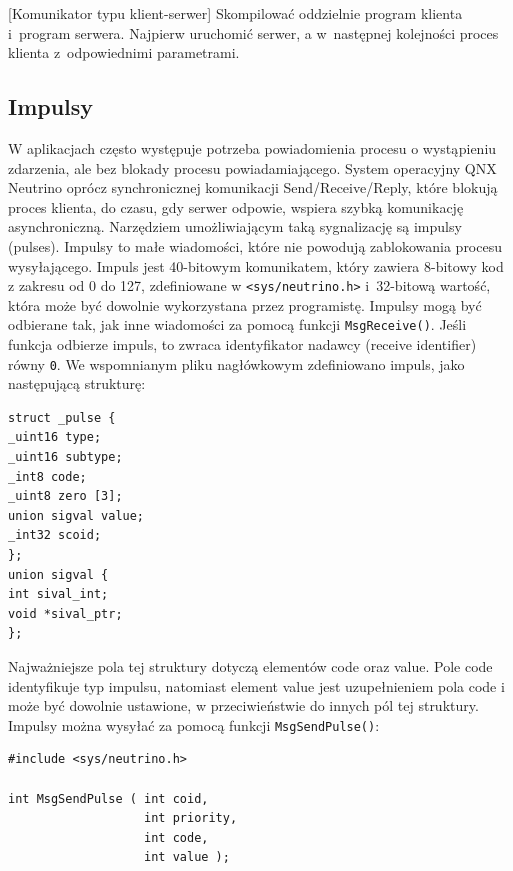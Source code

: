 \begin{example}{[Komunikator typu klient-serwer]} Skompilować oddzielnie program klienta i~program serwera. Najpierw uruchomić serwer, a w~następnej kolejności proces klienta z~odpowiednimi parametrami. 


\end{example} 




\subsection{Impulsy}

W aplikacjach często występuje potrzeba powiadomienia procesu o wystąpieniu zdarzenia, ale bez blokady procesu powiadamiającego. System operacyjny QNX Neutrino oprócz synchronicznej komunikacji Send/Receive/Reply, które blokują proces klienta, do czasu, gdy serwer odpowie, wspiera szybką komunikację asynchroniczną. Narzędziem umożliwiającym taką sygnalizację są impulsy (pulses). Impulsy to małe wiadomości, które nie powodują zablokowania procesu wysyłającego. Impuls jest 40-bitowym komunikatem, który zawiera 8-bitowy kod z zakresu od 0 do 127, zdefiniowane w \lstinline[style=MyCStyle]{<sys/neutrino.h>} i~32-bitową wartość, która może być dowolnie wykorzystana przez programistę. Impulsy mogą być odbierane tak, jak inne wiadomości za pomocą funkcji \lstinline[style=MyCStyle]{MsgReceive()}.  Jeśli funkcja odbierze impuls, to zwraca identyfikator nadawcy (receive identifier) równy \lstinline[style=MyCStyle]{0}. We wspomnianym pliku nagłówkowym zdefiniowano impuls, jako następującą strukturę: 

\begin{lstlisting}[style=MyCStyle]
struct _pulse {
_uint16 type;
_uint16 subtype;
_int8 code;
_uint8 zero [3];
union sigval value;
_int32 scoid;
};
union sigval {
int sival_int;
void *sival_ptr;
};
\end{lstlisting}

Najważniejsze pola tej struktury dotyczą elementów code oraz value. Pole code identyfikuje typ impulsu, natomiast element value jest uzupełnieniem pola code i może być dowolnie ustawione, w przeciwieństwie do innych pól tej struktury. 
Impulsy można wysyłać za pomocą funkcji \lstinline[style=MyCStyle]{MsgSendPulse()}: 

\begin{lstlisting}[style=MyCStyle]
#include <sys/neutrino.h>

int MsgSendPulse ( int coid,
                   int priority,
                   int code,
                   int value );
\end{lstlisting}

